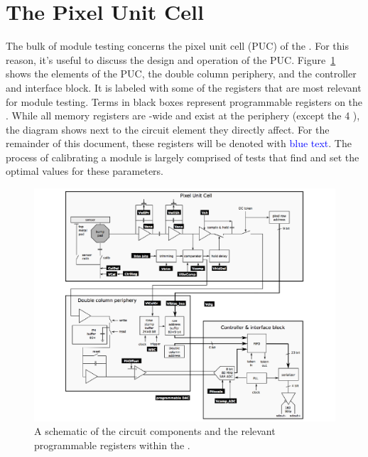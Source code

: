 \section{The Pixel Unit Cell}
\label{s:puc}

The bulk of module testing concerns the pixel unit cell (PUC) of the \roc.  
For this reason, it's useful to discuss the design and operation of the PUC.  
Figure~\ref{fig:puc} shows the elements of the PUC, the double column periphery, and the controller and interface block.  
It is labeled with some of the \dac registers that are most relevant for module testing.  
Terms in black boxes represent programmable \dac registers on the \roc.
While all \dac memory registers are \roc-wide and exist at the periphery (except the 4 \trimbits), 
the diagram shows \dacs next to the circuit element they directly affect.
For the remainder of this document, these \dac registers will be denoted with \textcolor{blue}{blue text}.  
The process of calibrating a module is largely comprised of tests that find and set the optimal values for these parameters.  

\begin{figure}[hbtp]
\begin{center}
\includegraphics[width=\textwidth]{figures/ROC_dac_schematic.pdf}
\caption{A schematic of the circuit components and the relevant programmable registers within the \roc.}
\label{fig:puc}
\end{center}
\end{figure}

